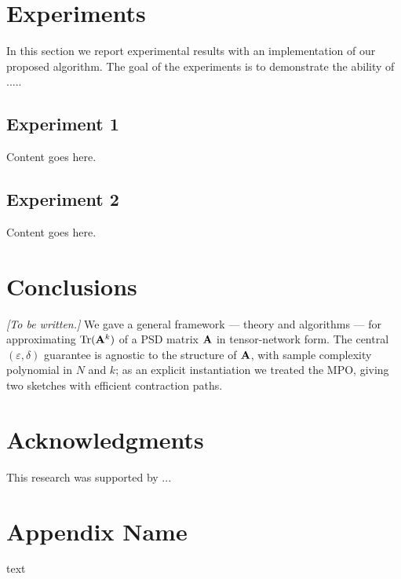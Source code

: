 \documentclass[11pt]{article}
\theoremstyle{plain}
\theoremstyle{definition}
\theoremstyle{remark}
\begin{document}
\section{Experiments}
\label{sec:experiments}

In this section we report experimental results with an implementation of our proposed algorithm. The goal of the experiments is to demonstrate the ability of .....

\subsection{Experiment 1}
Content goes here.

\subsection{Experiment 2}
Content goes here.


\section{Conclusions}
\emph{[To be written.]} We gave a general framework --- theory and algorithms ---
for approximating $\mathop{\mathrm{Tr}}(\mathbf{A}^{k})$ of a PSD matrix $\mathbf{A}$ in
tensor-network form. The central $(\varepsilon,\delta)$ guarantee is agnostic to the
structure of $\mathbf{A}$, with sample complexity polynomial in $N$ and $k$; as
an explicit instantiation we treated the MPO, giving two sketches with efficient
contraction paths.


\section{Acknowledgments}
This research was supported by ...


\printbibliography

\appendix \section{Appendix Name}  
\label{app:label for appendix} 
text
\end{document}
